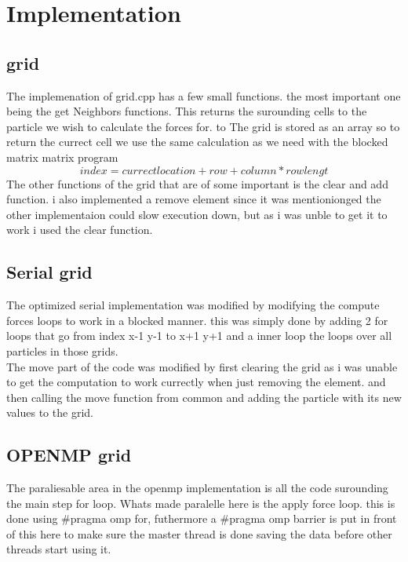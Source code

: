 \documentclass[a4paper,10pt,titlepage]{report}
\begin{document}
\section{Implementation}
\subsection{grid}
The implemenation of grid.cpp has a few small functions. the most important one being the get Neighbors functions. This returns the surounding cells to the particle we wish to calculate the forces for. to The grid is stored as an array so to return the currect cell we use the same calculation as we need with the blocked matrix matrix program
\begin{equation}
index = currect location + row + column * rowlengt
\end{equation}
The other functions of the grid that are of some important is the clear and add function. i also implemented a remove element since it was mentionionged the other implementaion could slow execution down, but as i was unble to get it to work i used the clear function.

\subsection{Serial grid}

The optimized serial implementation was modified by modifying the compute forces loops to work in a blocked manner. this was simply done by adding 2 for loops that go from index x-1 y-1 to x+1 y+1 and a inner loop the loops over all particles in those grids.\\
The move part of the code was modified by first clearing the grid as i was unable to get the computation to work currectly when just removing the element. and then calling the move function from common and adding the particle with its new values to the grid. 

\subsection{OPENMP grid}
The paraliesable area in the openmp implementation is all the code surounding the main step for loop. Whats made paralelle here is the apply force loop. this is done using \#pragma omp for, futhermore a \#pragma omp barrier is put in front of this here to make sure the master thread is done saving the data before other threads start using it. \\
\end{document}
